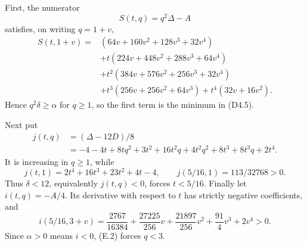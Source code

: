 \documentclass[11pt]{amsart}
\theoremstyle{definition}
\theoremstyle{remark}
\begin{document}
First, the numerator
\[
S(t,q)=q^2\Delta-A
\]
satisfies, on writing \(q=1+v\),
\[
\begin{split}
S(t,1+v)={}&
(64v+160v^2+128v^3+32v^4)\\
&+t(224v+448v^2+288v^3+64v^4)\\
&+t^2(384v+576v^2+256v^3+32v^4)\\
&+t^3(256v+256v^2+64v^3)
+t^4(32v+16v^2).
\end{split}
\tag{E.1}
\]
Hence \(q^2\delta\geq\alpha\) for \(q\geq1\), so the first term is the
minimum in (D4.5).

Next put
\[
\begin{split}
j(t,q)&=(\Delta-12D)/8\\
&=-4-4t+8tq^2+3t^2+16t^2q+4t^2q^2
  +8t^3+8t^3q+2t^4.
\end{split}
\]
It is increasing in \(q\geq1\), while
\[
j(t,1)=2t^4+16t^3+23t^2+4t-4,\qquad
j(5/16,1)=113/32768>0.
\]
Thus \(\delta<12\), equivalently \(j(t,q)<0\), forces \(t<5/16\).
Finally let \(i(t,q)=-A/4\).  Its derivative with respect to \(t\) has
strictly negative coefficients, and
\[
i(5/16,3+v)=
\frac{2767}{16384}+\frac{27225}{256}v
+\frac{21897}{256}v^2+\frac{91}{4}v^3+2v^4>0.
\tag{E.2}
\]
Since \(\alpha>0\) means \(i<0\), (E.2) forces \(q<3\).
\end{document}
